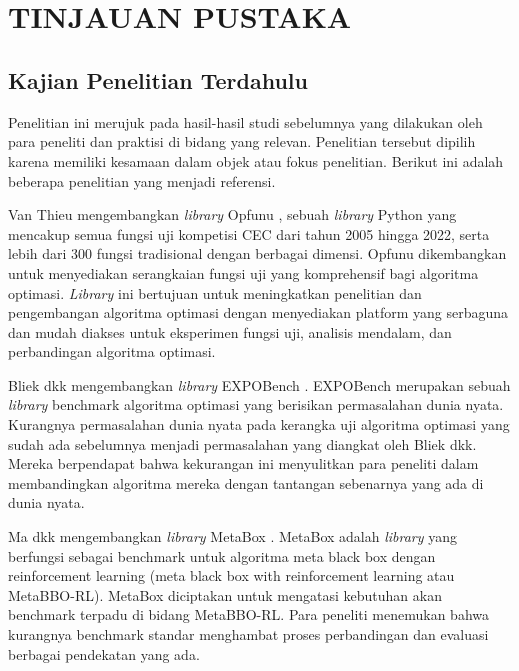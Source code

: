 
\chapter[TINJAUAN PUSTAKA]{\\ TINJAUAN PUSTAKA}

\section{Kajian Penelitian Terdahulu}
Penelitian ini merujuk pada hasil-hasil studi sebelumnya yang dilakukan oleh para peneliti dan praktisi di bidang yang relevan. Penelitian tersebut dipilih karena memiliki kesamaan dalam objek atau fokus penelitian. Berikut ini adalah beberapa penelitian yang menjadi referensi.

Van Thieu mengembangkan \textit{library} Opfunu \citep{Van_Thieu_2024}, sebuah \textit{library} Python yang mencakup semua fungsi uji kompetisi CEC dari tahun 2005 hingga 2022, serta lebih dari 300 fungsi tradisional dengan berbagai dimensi. Opfunu dikembangkan untuk menyediakan serangkaian fungsi uji yang komprehensif bagi algoritma optimasi. \textit{Library} ini bertujuan untuk meningkatkan penelitian dan pengembangan algoritma optimasi dengan menyediakan platform yang serbaguna dan mudah diakses untuk eksperimen fungsi uji, analisis mendalam, dan perbandingan algoritma optimasi.

Bliek dkk mengembangkan \textit{library} EXPOBench \citep{Bliek_2023}. EXPOBench merupakan sebuah \textit{library}
benchmark algoritma optimasi yang berisikan permasalahan dunia nyata. Kurangnya permasalahan
dunia nyata pada kerangka uji algoritma optimasi yang sudah ada sebelumnya menjadi permasalahan
yang diangkat oleh Bliek dkk. Mereka berpendapat bahwa kekurangan ini menyulitkan para peneliti
dalam membandingkan algoritma mereka dengan tantangan sebenarnya yang ada di dunia nyata.

Ma dkk mengembangkan \textit{library} MetaBox \citep{ma_zeyan_guo_chen_jiacheng_zhenrui_peng_gong_ma_cao_2023}. MetaBox adalah \textit{library} yang berfungsi sebagai benchmark untuk algoritma meta black box dengan reinforcement learning (meta black box with reinforcement learning atau MetaBBO-RL). MetaBox diciptakan untuk mengatasi kebutuhan akan benchmark terpadu di bidang MetaBBO-RL. Para peneliti menemukan bahwa kurangnya benchmark standar menghambat proses perbandingan dan evaluasi berbagai pendekatan yang ada.

